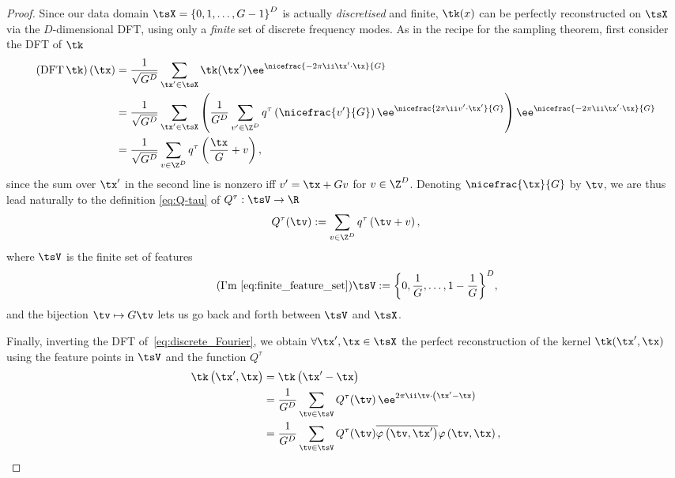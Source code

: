\begin{proof}
 Since our data domain 
\(
  \tsX=\left\{0,1,\ldots,{G}-1\right\}^D
\) is actually \textit{discretised} and finite,
$\tk(x)$ can be perfectly reconstructed on $\tsX$ via the $D$-dimensional DFT, using only a \textit{finite} set of discrete frequency modes. As in the recipe for the sampling theorem, first consider the DFT of $\tk$
\begin{align}
  \label{eq:discrete_Fourier}
  \left(\mathrm{DFT}\,\tk\right)(\tx)
          &=\frac{1}{\sqrt{{G}^D}}\sum_{\tx'\in\tsX}\tk(\tx')\ee^{\nicefrac{-2\pi\ii \tx'\cdot \tx}{G}}\nonumber\\
          &=\frac{1}{\sqrt{{G}^D}}\sum_{\tx'\in\tsX}\left(\frac{1}{{G}^D}\sum_{v'\in\Z^D}q^{\tau}\left(\nicefrac{v'}{G}\right)\ee^{\nicefrac{2\pi\ii  v'\cdot \tx'}{G}}\right)\ee^{\nicefrac{-2\pi\ii \tx'\cdot \tx}{G}}\nonumber\\
          &=\frac{1}{\sqrt{{G}^D}}\sum_{v\in\Z^D}q^{\tau}\left(\frac{\tx}{G}+v\right),
\end{align}
since the sum over $\tx'$ in the second line is nonzero iff $ v'=\tx+Gv$ for $v\in\Z^D$. Denoting $\nicefrac{\tx}{G}$ by $\tv$, we are thus lead naturally to the definition \cref{eq:Q-tau} of $Q^{\tau}:\tsV \to\R$
\begin{equation}
  \label{eq:q_tau_g_function}
  Q^{\tau}(\tv):=\sum_{v\in\Z^D}q^{\tau}\left(\tv+v\right),
\end{equation}
where $\tsV $ is the finite set  of features
\begin{equation*}
      \tag{I'm \ref{eq:finite_feature_set}}
      \tsV :={\left\{0,\frac{1}{G},\ldots,1-\frac{1}{G}\right\}}^D,
\end{equation*}
and the bijection $\tv\mapsto G\tv$ lets us go back and forth between $\tsV $ and $\tsX$.

Finally, inverting the  DFT of~\cref{eq:discrete_Fourier},
we obtain $\forall \tx',\tx\in\tsX$ the perfect reconstruction of the kernel $\tk(\tx',\tx)$ using the feature points in $\tsV $ and the function $Q^{\tau}$
\begin{align}
  \label{eq:perfect_reconstruction}
  \tk\left(\tx',\tx\right)&=\tk\left(\tx'-\tx\right)\nonumber\\
  &=\frac{1}{{G}^D}\sum_{\tv\in\tsV} Q^{\tau}(\tv)\, \ee^{2\pi\ii \tv\cdot \left(\tx'-\tx\right)}\nonumber\\
  &=\frac{1}{{G}^D}\sum_{\tv\in\tsV }Q^{\tau}(\tv)\overline{\varphi\left(\tv,\tx'\right)}\varphi\left(\tv,\tx\right),
\end{align}


\end{proof}
